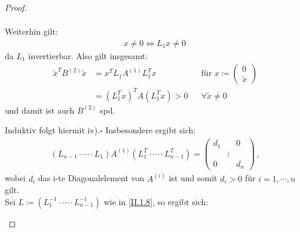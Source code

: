 \documentclass[ngerman,fontsize=11pt, paper=a4, parskip=half, titlepage=true, toc=bib]{scrbook}
\theoremstyle{definition}
\theoremstyle{plain}
\begin{document}
\begin{proof}
\begin{enumerate}[i)]
\begin{align*}
    			\end{align*}
    			Weiterhin gilt:
    			\begin{gather*}
    			x\neq 0 \Leftrightarrow L_1 x\neq 0 \,
    			\end{gather*}
    			da $L_1$ invertierbar. Also gilt insgesamt:
    			\begin{align*}
    			\widetilde{x}^TB^{(2)} \widetilde{x} &= x^T L_1A^{(1)}L_1^Tx
    			&&  \text{für } x\coloneqq \begin{pmatrix}	0 \\ \widetilde{x}\end{pmatrix}\\
    			&= (L_1^Tx)^TA(L_1^Tx) > 0
    			&& \forall \widetilde{x}\neq 0 
    			\end{align*}
    			und damit ist auch $B^{(2)}$ spd.
    			
    			Induktiv folgt hiermit iv).\hfill $\square$
    			Insbesondere ergibt sich: 
    			\begin{gather*}
    			(L_{n-1}\cdot \cdots\cdot L_1)A^{(1)}(L_1^T\cdot \cdots \cdot L_{n-1}^T) 
    			= \begin{pmatrix} d_1 & & 0 \\ &\vdots& \\ 0&& d_n\end{pmatrix} \, ,
    			\end{gather*}
    			wobei $d_i$ das i-te Diagonalelement von $A^{(i)}$ ist und somit $d_i>0$ für $ i= 1, \cdots , n$ gilt. \\
    			
    			Sei $L\coloneqq (L_1^{-1}\cdot \cdots \cdot L_{n-1}^{-1})$ wie in \eqref{II.1.8}, so ergibt sich:
    		\end{enumerate}
    	\end{proof}		
  
\end{document}
